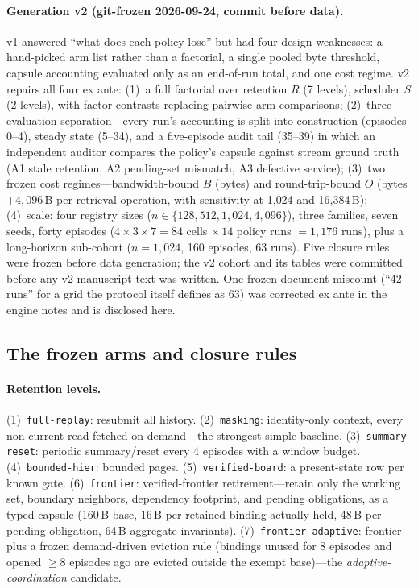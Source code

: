 \paragraph{Generation v2 (git-frozen 2026-09-24, commit before data).}
v1 answered ``what does each policy lose'' but had four design
weaknesses: a hand-picked arm list rather than a factorial, a single
pooled byte threshold, capsule accounting evaluated only as an
end-of-run total, and one cost regime. v2 repairs all four ex ante:
(1)~a full factorial over retention $R$ (7 levels), scheduler $S$
(2 levels), with factor contrasts replacing pairwise arm comparisons;
(2)~three-evaluation separation---every run's accounting is split into
construction (episodes 0--4), steady state (5--34), and a five-episode
audit tail (35--39) in which an independent auditor compares the
policy's capsule against stream ground truth (A1 stale retention, A2
pending-set mismatch, A3 defective service); (3)~two frozen cost
regimes---bandwidth-bound $B$ (bytes) and round-trip-bound $O$ (bytes
$+4{,}096$\,B per retrieval operation, with sensitivity at 1{,}024 and
16{,}384\,B); (4)~scale: four registry sizes ($n\in\{128,512,1{,}024,
4{,}096\}$), three families, seven seeds, forty episodes
($4\times3\times7=84$ cells $\times\,14$ policy runs $=1{,}176$ runs),
plus a long-horizon sub-cohort ($n=1{,}024$, 160 episodes, 63 runs).
Five closure rules were frozen before data generation; the v2 cohort
and its tables were committed before any v2 manuscript text was
written. One frozen-document miscount (``42 runs'' for a grid the
protocol itself defines as 63) was corrected ex ante in the engine
notes and is disclosed here.

\subsection{The frozen arms and closure rules}\label{sec:retire-protocol}
\paragraph{Retention levels.} (1)~\texttt{full-replay}: resubmit all
history. (2)~\texttt{masking}: identity-only context, every non-current
read fetched on demand---the strongest simple baseline.
(3)~\texttt{summary-reset}: periodic summary/reset every 4 episodes
with a window budget. (4)~\texttt{bounded-hier}: bounded pages.
(5)~\texttt{verified-board}: a present-state row per known gate.
(6)~\texttt{frontier}: verified-frontier retirement---retain only the
working set, boundary neighbors, dependency footprint, and pending
obligations, as a typed capsule (160\,B base, 16\,B per retained
binding actually held, 48\,B per pending obligation, 64\,B aggregate
invariants). (7)~\texttt{frontier-adaptive}: frontier plus a frozen
demand-driven eviction rule (bindings unused for 8 episodes and opened
$\ge$8 episodes ago are evicted outside the exempt base)---the
\emph{adaptive-coordination} candidate.
